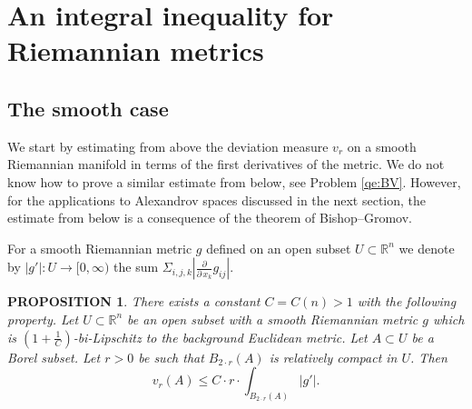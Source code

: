 \documentclass[12pt,leqno,intlimits]{amsart}
\numberwithin{equation}{section}
\newtheorem{prop}[thm]{PROPOSITION}
\theoremstyle{definition}
\newtheorem{defn}[thm]{Definition}%
\theoremstyle{remark}
\newcommand{\R}{\mathbb{R}}
\def\:{\colon}
\begin{document}




\section{An integral inequality for Riemannian metrics}\label{sec-BV-estimate}
\subsection{The smooth case} We start by estimating from above the deviation measure $v_r$ on a smooth Riemannian manifold in terms of the first
derivatives of the metric. We do not know how to prove a similar estimate from below, see Problem \ref{qe:BV}. However, for the applications
to Alexandrov spaces discussed in the next section, the estimate from below is a consequence of the theorem of Bishop--Gromov.

For a smooth Riemannian metric $g$ defined on an open subset $U\subset \R^n$ we denote by $|g'|\:U\to [0,\infty)$ the sum $\Sigma_{i,j,k}|\frac \partial {\partial \,x_k} g_{ij}|$.


\begin{prop}\label{prop-smooth}
There exists a constant $C=C(n)>1$ with the following property.
Let $U\subset \R^n$ be an open subset with a smooth Riemannian
metric $g$ which is $(1+\frac 1 C)$-bi-Lipschitz to the background Euclidean metric.
Let $A\subset U$ be a Borel subset. Let $r>0$ be such that $B_{2{\cdot}r} (A)$ is relatively compact in $U$.
Then 
$$v_r (A) \leq C \cdot r \cdot \int _{B_{2{\cdot}r} ( A)} |g' |.$$
\end{prop}
\end{document}
